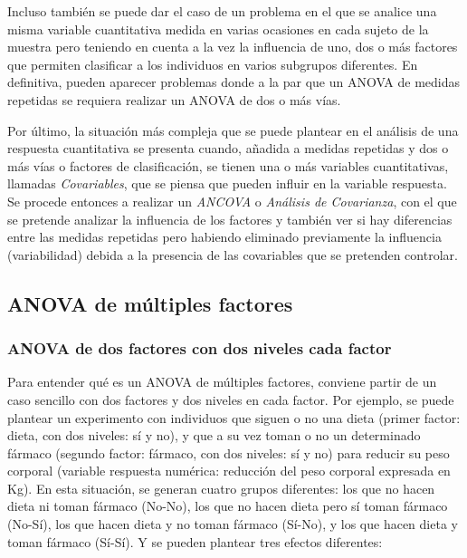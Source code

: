 Incluso también se puede dar el caso de un problema en el que se analice una misma variable cuantitativa medida en
varias ocasiones en cada sujeto de la muestra pero teniendo en cuenta a la vez la influencia de uno, dos o más factores
que permiten clasificar a los individuos en varios subgrupos diferentes.
En definitiva, pueden aparecer problemas donde a la par que un ANOVA de medidas repetidas se requiera realizar un ANOVA
de dos o más vías.

Por último, la situación más compleja que se puede plantear en el análisis de una respuesta cuantitativa se presenta
cuando, añadida a medidas repetidas y dos o más vías o factores de clasificación, se tienen una o más variables
cuantitativas, llamadas \emph{Covariables}, que se piensa que pueden influir en la variable respuesta.
Se procede entonces a realizar un \emph{ANCOVA} o \emph{Análisis de Covarianza}, con el que se pretende analizar la
influencia de los factores y también ver si hay diferencias entre las medidas repetidas pero habiendo eliminado
previamente la influencia (variabilidad) debida a la presencia de las covariables que se pretenden controlar.


\subsection{ANOVA de múltiples factores}
\subsubsection{ANOVA de dos factores con dos niveles cada factor}
Para entender qué es un ANOVA de múltiples factores, conviene partir de un caso sencillo con dos factores y dos niveles
en cada factor. Por ejemplo, se puede plantear un experimento con individuos que siguen o no una dieta (primer factor:
dieta, con dos niveles: sí y no), y que a su vez toman o no un determinado fármaco (segundo factor: fármaco, con dos
niveles: sí y no) para reducir su peso corporal (variable respuesta numérica: reducción del peso corporal expresada en
Kg). En esta situación, se generan cuatro grupos diferentes: los que no hacen dieta ni toman fármaco (No-No), los que no
hacen dieta pero sí toman fármaco (No-Sí), los que hacen dieta y no toman fármaco (Sí-No), y los que hacen dieta y toman
fármaco (Sí-Sí). Y se pueden plantear tres efectos diferentes:

